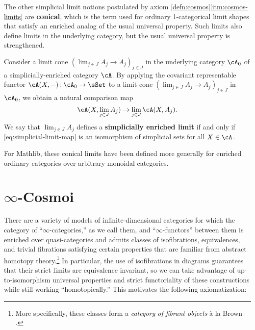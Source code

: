 The other simplicial limit notions postulated by axiom \ref{defn:cosmos}\ref{itm:cosmos-limits} are \textbf{conical}, which is the term used for ordinary 1-categorical limit shapes that satisfy an enriched analog of the usual universal property.   Such limits also define limits in the underlying category, but the usual universal property is strengthened.

\begin{definition}\label{defn:simplicial-conical-limit}
  \leanok
{}
  Consider a limit cone $(\lim_{j \in J}A_j \to A_j)_{j \in J}$ in the underlying category $\cA_0$ of a simplicially-enriched category $\cA$.  By applying the covariant rep\-re\-sentable functor $\cA(X,-) \colon \cA_0 \to \sSet$ to a limit cone $(\lim_{j \in J}A_j \to A_j)_{j \in J}$ in $\cA_0$, we obtain a natural comparison map
  \begin{equation}\label{eq:simplicial-limit-map} \cA(X,\lim_{j \in J}A_j) \to \lim_{j \in J}\cA(X,A_j).
  \end{equation}
  We say that $\lim_{j\in J}A_j$ defines a \textbf{simplicially enriched limit} if and only if \eqref{eq:simplicial-limit-map} is an isomorphism of simplicial sets for all $X \in \cA$.
\end{definition}

\begin{rmk}
  For Mathlib, these conical limits have been defined more generally for
  enriched ordinary categories over arbitrary monoidal categories.
\end{rmk}

\section{\texorpdfstring{$\infty$}{Infinity}-Cosmoi}\label{sec:cosmos}

There are a variety of models of infinite-dimensional categories for which the category of ``$\infty$-categories,'' as we call them, and ``$\infty$-functors'' between them is enriched over quasi-categories and admits classes of isofibrations, equivalences, and trivial fibrations satisfying certain
properties that are familiar from abstract homotopy theory.\footnote{More specifically, these classes form a \emph{category of fibrant objects} \`{a} la Brown \cite{Brown:1973ah}.} In particular, the use of isofibrations in diagrams guarantees that their strict limits are equivalence invariant, so we can take advantage of up-to-isomorphism universal properties and strict functoriality of these constructions while still working ``homotopically.'' This motivates the following axiomatization:


